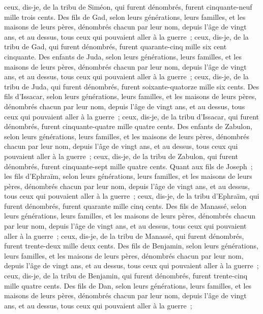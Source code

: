 \begin{multicols}{2}
ceux, dis-je, de la tribu de Siméon, qui furent dénombrés, furent cinquante-neuf mille trois cents.
Des fils de Gad, selon leurs générations, leurs familles, et les maisons de leurs pères, dénombrés chacun par leur nom, depuis l'âge de vingt ans, et au dessus, tous ceux qui pouvaient aller à la guerre~;
ceux, dis-je, de la tribu de Gad, qui furent dénombrés, furent quarante-cinq mille six cent cinquante.
Des enfants de Juda, selon leurs générations, leurs familles, et les maisons de leurs pères, dénombrés chacun par leur nom, depuis l'âge de vingt ans, et au dessus, tous ceux qui pouvaient aller à la guerre~;
ceux, dis-je, de la tribu de Juda, qui furent dénombrés, furent soixante-quatorze mille six cents.
Des fils d'Issacar, selon leurs générations, leurs familles, et les maisons de leurs pères, dénombrés chacun par leur nom, depuis l'âge de vingt ans, et au dessus, tous ceux qui pouvaient aller à la guerre~;
ceux, dis-je, de la tribu d'Issacar, qui furent dénombrés, furent cinquante-quatre mille quatre cents.
Des enfants de Zabulon, selon leurs générations, leurs familles, et les maisons de leurs pères, dénombrés chacun par leur nom, depuis l'âge de vingt ans, et au dessus, tous ceux qui pouvaient aller à la guerre~;
ceux, dis-je, de la tribu de Zabulon, qui furent dénombrés, furent cinquante-sept mille quatre cents.
Quant aux fils de Joseph~; les fils d'Ephraïm, selon leurs générations, leurs familles, et les maisons de leurs pères, dénombrés chacun par leur nom, depuis l'âge de vingt ans, et au dessus, tous ceux qui pouvaient aller à la guerre~;
ceux, dis-je, de la tribu d'Ephraïm, qui furent dénombrés, furent quarante mille cinq cents.
Des fils de Manassé, selon leurs générations, leurs familles, et les maisons de leurs pères, dénombrés chacun par leur nom, depuis l'âge de vingt ans, et au dessus, tous ceux qui pouvaient aller à la guerre~;
ceux, dis-je, de la tribu de Manassé, qui furent dénombrés, furent trente-deux mille deux cents.
Des fils de Benjamin, selon leurs générations, leurs familles, et les maisons de leurs pères, dénombrés chacun par leur nom, depuis l'âge de vingt ans, et au dessus, tous ceux qui pouvaient aller à la guerre~;
ceux, dis-je, de la tribu de Benjamin, qui furent dénombrés, furent trente-cinq mille quatre cents.
Des fils de Dan, selon leurs générations, leurs familles, et les maisons de leurs pères, dénombrés chacun par leur nom, depuis l'âge de vingt ans, et au dessus, tous ceux qui pouvaient aller à la guerre~;

\end{multicols}

